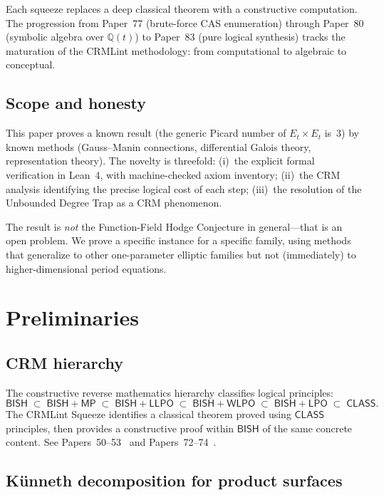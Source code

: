 \documentclass[11pt]{article}
\theoremstyle{plain}
\theoremstyle{definition}
\theoremstyle{remark}
\newcommand{\Q}{\mathbb{Q}}
\newcommand{\BISH}{\mathsf{BISH}}
\newcommand{\LPO}{\mathsf{LPO}}
\newcommand{\WLPO}{\mathsf{WLPO}}
\newcommand{\LLPO}{\mathsf{LLPO}}
\newcommand{\MP}{\mathsf{MP}}
\newcommand{\CLASS}{\mathsf{CLASS}}
\begin{document}
\noindent
Each squeeze replaces a deep classical theorem with a constructive computation.
The progression from Paper~77 (brute-force CAS enumeration) through Paper~80 (symbolic algebra over $\Q(t)$) to Paper~83 (pure logical synthesis) tracks the maturation of the CRMLint methodology: from computational to algebraic to conceptual.

\subsection{Scope and honesty}

This paper proves a known result (the generic Picard number of $E_t \times E_t$ is~3) by known methods (Gauss--Manin connections, differential Galois theory, representation theory).
The novelty is threefold: (i)~the explicit formal verification in Lean~4, with machine-checked axiom inventory; (ii)~the CRM analysis identifying the precise logical cost of each step; (iii)~the resolution of the Unbounded Degree Trap as a CRM phenomenon.

The result is \emph{not} the Function-Field Hodge Conjecture in general---that is an open problem.
We prove a specific instance for a specific family, using methods that generalize to other one-parameter elliptic families but not (immediately) to higher-dimensional period equations.

\section{Preliminaries}
\label{sec:prelim}

\subsection{CRM hierarchy}

The constructive reverse mathematics hierarchy classifies logical principles:
\[
  \BISH \;\subset\; \BISH + \MP \;\subset\; \BISH + \LLPO \;\subset\; \BISH + \WLPO \;\subset\; \BISH + \LPO \;\subset\; \CLASS.
\]
The CRMLint Squeeze identifies a classical theorem proved using $\CLASS$ principles, then provides a constructive proof within $\BISH$ of the same concrete content.
See Papers~50--53~\cite{Lee2024P50} and Papers~72--74~\cite{Lee2025P72}.

\subsection{K\"unneth decomposition for product surfaces}
\end{document}
